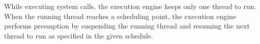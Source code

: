 While executing system calls, the execution engine keeps only one
thread to run.
%
When the running thread reaches a scheduling point, the execution
engine performs preemption by suspending the running thread and
resuming the next thread to run as specified in the given schedule.











